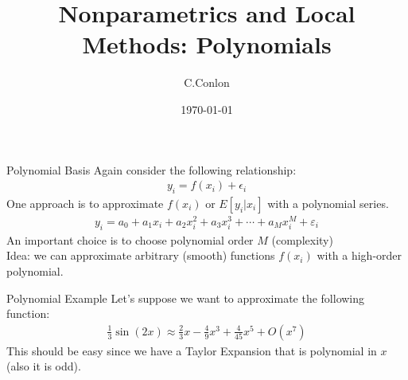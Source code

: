 \documentclass[11pt,handout,xcolor=pdftex,dvipsnames,table,mathserif,aspectratio=169]{beamer}
\title [Nonparametrics]{Nonparametrics and Local Methods: Polynomials}
\author{C.Conlon}
\institute{Applied Econometrics}
\date{\today}
\begin{document}
\begin{frame}
\titlepage
\end{frame}

\begin{frame}{Polynomial Basis}
Again consider the following relationship:
\begin{align*}
y_i = f(x_i) + \epsilon_i
\end{align*}
One approach is to approximate $f(x_i)$ or $E[y_i | x_i]$ with a \alert{polynomial series}.
\begin{align*}
y_i = a_0  + a_1 x_i + a_2 x_i^2 + a_3 x_i^3+ \cdots+ a_M x_i^M + \varepsilon_i
\end{align*}
An important choice is to choose polynomial order $M$ (complexity)\\
Idea: we can approximate \alert{arbitrary (smooth) functions} $f(x_i)$ with a high-order polynomial.
\end{frame}

\begin{frame}{Polynomial Example}
Let's suppose we want to approximate the following function:
\begin{align*}
\frac{1}{3} \sin (2 x) \approx \frac{2}{3} x - \frac{4}{9} x^3 + \frac{4}{45} x^5 + O(x^7)
\end{align*}
This should be easy since we have a \alert{Taylor Expansion} that is polynomial in $x$ (also it is odd).
\end{frame}
\end{document}
